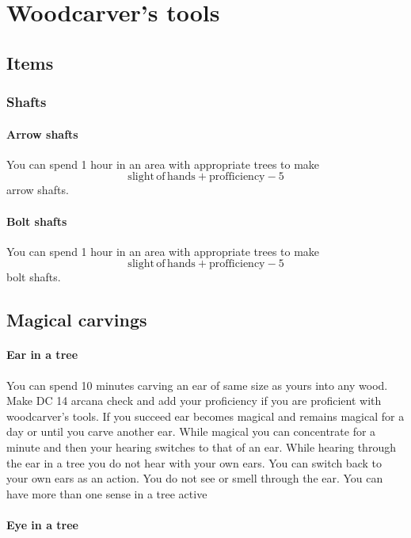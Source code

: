 \chapter{Woodcarver's tools}

\section{Items}

\subsection{Shafts}

\subsubsection{Arrow shafts}

You can spend 1 hour in an area with appropriate trees to make $$\mathrm{slight\,of\,hands} + \mathrm{profficiency} - 5$$ arrow shafts.

\subsubsection{Bolt shafts}

You can spend 1 hour in an area with appropriate trees to make $$\mathrm{slight\,of\,hands} + \mathrm{profficiency} - 5$$ bolt shafts.

\section{Magical carvings}

\subsubsection{Ear in a tree}

You can spend 10 minutes carving an ear of same size as yours into any wood. Make DC 14 arcana check and add your proficiency if you are proficient with woodcarver's tools. If you succeed ear becomes magical and remains magical for a day or until you carve another ear. While magical you can concentrate for a minute and then your hearing switches to that of an ear. While hearing through the ear in a tree you do not hear with your own ears. You can switch back to your own ears as an action. You do not see or smell through the ear. You can have more than one sense in a tree active

\subsubsection{Eye in a tree}

